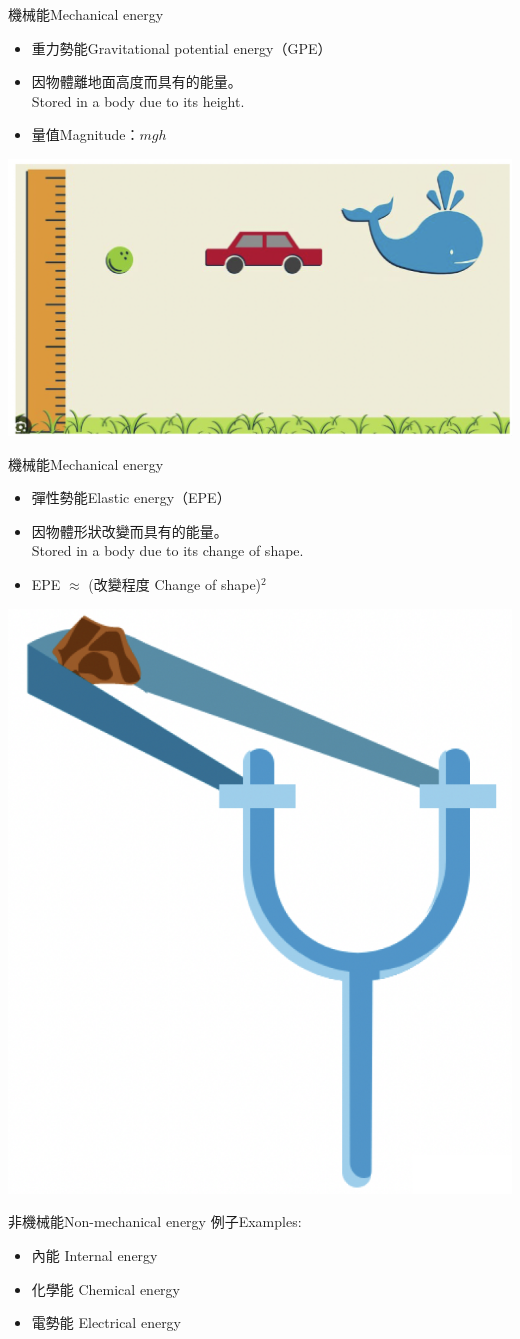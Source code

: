 \documentclass[beamer=true]{standalone}
\begin{document}
\begin{frame}{機械能Mechanical energy}
    \begin{itemize}
        \item 重力勢能Gravitational potential energy（GPE）
        \item 因物體離地面高度而具有的能量。\\Stored in a body due to its height.
        \item 量值Magnitude：$mgh$
    \end{itemize}\bigskip
    {\par\centering
        \includegraphics[width=.5\textwidth]{assets/86718add.png}
        \par}
\end{frame}

\begin{frame}{機械能Mechanical energy}
    \begin{itemize}
        \item 彈性勢能Elastic energy（EPE）
        \item 因物體形狀改變而具有的能量。\\Stored in a body due to its change of shape.
        \item EPE $\approx$ (改變程度 Change of shape)$^2$
    \end{itemize}\bigskip
    {\par\centering
        \includegraphics[width=.3\textwidth]{assets/aa983381.png}
        \par}
\end{frame}

\begin{frame}{非機械能Non-mechanical energy}
    例子Examples:
    \begin{itemize}
        \setlength{\itemsep}{12pt}
        \item 內能 Internal energy
        \item 化學能 Chemical energy
        \item 電勢能 Electrical energy
    \end{itemize}
\end{frame}
\end{document}
